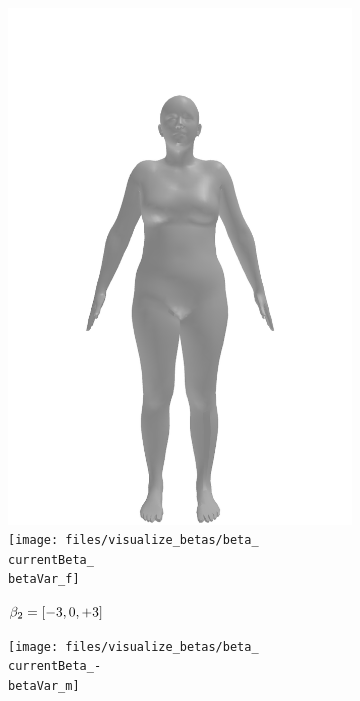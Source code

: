 \begin{figure}[ht!]
\begin{subfigure}{\betaWidth}
        \includegraphics[width=\imgWidth]{files/visualize_betas/baseline_f}
        \texttt{[image: files/visualize\_betas/beta\_\\currentBeta\_\\betaVar\_f]}
        \caption{$\beta_2 = [-3, 0, +3]$}
    \end{subfigure}
    \begin{subfigure}{\betaWidth}
        \def\currentBeta{2}
        \centering
        \texttt{[image: files/visualize\_betas/beta\_\\currentBeta\_-\\betaVar\_m]}

\end{subfigure}
\end{figure}
